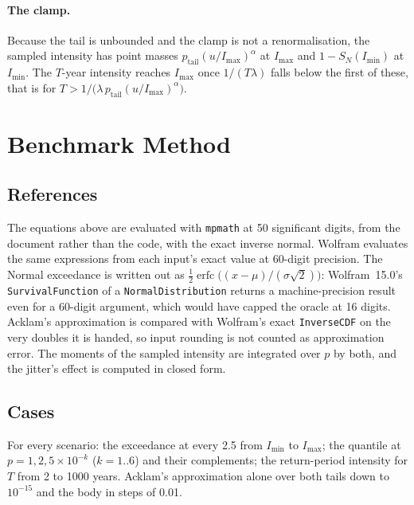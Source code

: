\documentclass[11pt,a4paper]{article}
\begin{document}
\paragraph{The clamp.} Because the tail is unbounded and the clamp is not a
renormalisation, the sampled intensity has point masses
$p_{\text{tail}}(u/I_{\max})^{\alpha}$ at $I_{\max}$ and $1-S_N(I_{\min})$ at
$I_{\min}$. The $T$-year intensity reaches $I_{\max}$ once $1/(T\lambda)$ falls
below the first of these, that is for $T>1/\bigl(\lambda\,p_{\text{tail}}(u/I_{\max})^{\alpha}\bigr)$.

\section{Benchmark Method}

\subsection{References}
The equations above are evaluated with \texttt{mpmath} at 50 significant digits, from
the document rather than the code, with the exact inverse normal. Wolfram evaluates
the same expressions from each input's exact value at 60-digit precision. The Normal
exceedance is written out as $\tfrac12\operatorname{erfc}\bigl((x-\mu)/(\sigma\sqrt2)\bigr)$:
Wolfram~15.0's \texttt{SurvivalFunction} of a \texttt{NormalDistribution} returns a
machine-precision result even for a 60-digit argument, which would have capped the
oracle at 16 digits. Acklam's approximation is compared with Wolfram's exact
\texttt{InverseCDF} on the very doubles it is handed, so input rounding is not
counted as approximation error. The moments of the sampled intensity are integrated
over $p$ by both, and the jitter's effect is computed in closed form.

\subsection{Cases}
For every scenario: the exceedance at every 2.5 from $I_{\min}$ to $I_{\max}$; the
quantile at $p=1,2,5\times10^{-k}$ ($k=1..6$) and their complements; the return-period
intensity for $T$ from 2 to 1000 years. Acklam's approximation alone over both tails
down to $10^{-15}$ and the body in steps of 0.01.

\mkmvalidation
\end{document}
